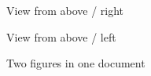 \documentclass{article}
\begin{document}
\clearpage
\begin{center}
\Large View from above / right\par\bigskip
{}
\end{center}
\clearpage
\begin{center}
\Large View from above / left\par\bigskip
{}
\end{center}
\clearpage
\begin{center}
Two figures in one document\par\bigskip
{}\par
{}
\end{center}
\end{document}
